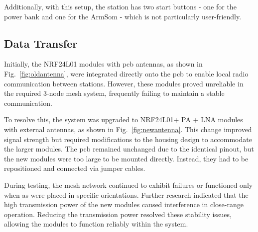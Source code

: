 Additionally, with this setup, the station has two start buttons - one for the power bank and one for the ArmSom - which is not particularly user-friendly.

\subsection{Data Transfer}

Initially, the NRF24L01 \cite{nRF24L01} modules with \acrshort{pcb} antennas, as shown in Fig.~\ref{fig:oldantenna}, were integrated directly onto the \acrshort{pcb} to enable local radio communication between stations. However, these modules proved unreliable in the required 3-node mesh system, frequently failing to maintain a stable communication.

To resolve this, the system was upgraded to NRF24L01+ PA + LNA \cite{nRF24L01_plus} modules with external antennas, as shown in Fig.~\ref{fig:newantenna}. This change improved signal strength but required modifications to the housing design to accommodate the larger modules. The \acrshort{pcb} remained unchanged due to the identical pinout, but the new modules were too large to be mounted directly. Instead, they had to be repositioned and connected via jumper cables.

During testing, the mesh network continued to exhibit failures or functioned only when as were placed in specific orientations. Further research indicated that the high transmission power of the new modules caused interference in close-range operation. Reducing the transmission power resolved these stability issues, allowing the modules to function reliably within the system.

